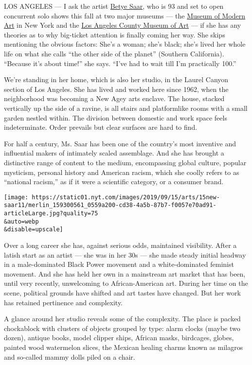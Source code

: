 LOS ANGELES --- I ask the artist \href{http://www.betyesaar.net/}{Betye
Saar}, who is 93 and set to open concurrent solo shows this fall at two
major museums --- the
\href{https://www.moma.org/artists/5102?gclid=EAIaIQobChMIvY62loKT5AIVUQOGCh06tQ5iEAAYASAAEgJRffD_BwE\&gclsrc=aw.ds}{Museum
of Modern Art} in New York and the
\href{https://www.lacma.org/art/exhibition/betye-saar-call-and-response}{Los
Angeles County Museum of Art} --- if she has any theories as to why
big-ticket attention is finally coming her way. She skips mentioning the
obvious factors: She's a woman; she's black; she's lived her whole life
on what she calls ``the other side of the planet'' (Southern
California). ``Because it's about time!'' she says. ``I've had to wait
till I'm practically 100.''

We're standing in her home, which is also her studio, in the Laurel
Canyon section of Los Angeles. She has lived and worked here since 1962,
when the neighborhood was becoming a New Agey arts enclave. The house,
stacked vertically up the side of a ravine, is all stairs and
platformlike rooms with a small garden nestled within. The division
between domestic and work space feels indeterminate. Order prevails but
clear surfaces are hard to find.

For half a century, Ms. Saar has been one of the country's most
inventive and influential makers of intimately scaled assemblage. And
she has brought a distinctive range of content to the medium,
encompassing global culture, popular mysticism, personal history and
American racism, which she coolly refers to as ``national racism,'' as
if it were a scientific category, or a consumer brand.

\texttt{[image: https://static01.nyt.com/images/2019/09/15/arts/15new-saar11/merlin\_159300561\_0559a200-cd38-4a5b-87b7-f0057e70ad91-articleLarge.jpg?quality=75\\\&auto=webp\\\&disable=upscale]}

Over a long career she has, against serious odds, maintained visibility.
After a latish start as an artist --- she was in her 30s --- she made
steady initial headway in a male-dominated Black Power movement and a
white-dominated feminist movement. And she has held her own in a
mainstream art market that has been, until very recently, unwelcoming to
African-American art. During her time on the scene, political grounds
have shifted and art tastes have changed. But her work has retained
pertinence and complexity.

A glance around her studio reveals some of the complexity. The place is
packed chockablock with clusters of objects grouped by type: alarm
clocks (maybe two dozen), antique books, model clipper ships, African
masks, birdcages, globes, painted wood watermelon slices, the Mexican
healing charms known as milagros and so-called mammy dolls piled on a
chair.

